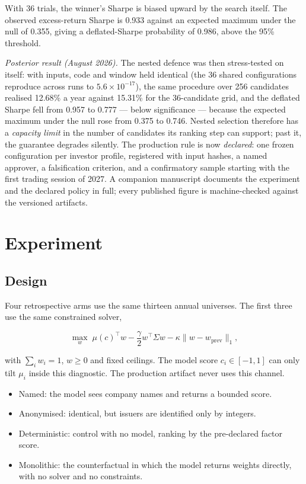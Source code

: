 \documentclass[10pt,conference]{IEEEtran}
\begin{document}
With 36 trials, the winner's Sharpe is biased upward by the search itself. The observed excess-return Sharpe is 0.933 against an expected maximum under the null of 0.355, giving a deflated-Sharpe probability of 0.986, above the 95\% threshold.

\emph{Posterior result (August 2026).} The nested defence was then stress-tested on itself: with inputs, code and window held identical (the 36 shared configurations reproduce across runs to $5.6\times10^{-17}$), the same procedure over 256 candidates realised 12.68\% a year against 15.31\% for the 36-candidate grid, and the deflated Sharpe fell from 0.957 to 0.777 --- below significance --- because the expected maximum under the null rose from 0.375 to 0.746. Nested selection therefore has a \emph{capacity limit} in the number of candidates its ranking step can support; past it, the guarantee degrades silently. The production rule is now \emph{declared}: one frozen configuration per investor profile, registered with input hashes, a named approver, a falsification criterion, and a confirmatory sample starting with the first trading session of 2027. A companion manuscript documents the experiment and the declared policy in full; every published figure is machine-checked against the versioned artifacts.

\section{Experiment}

\subsection{Design}

Four retrospective arms use the same thirteen annual universes. The first three use the same constrained solver,

\begin{equation}
\max_w\;\mu(c)^\top w-\frac{\gamma}{2}w^\top\Sigma w-\kappa\lVert w-w_{\mathrm{prev}}\rVert_1,
\end{equation}

with $\sum_iw_i=1$, $w\ge0$ and fixed ceilings. The model score $c_i\in[-1,1]$ can only tilt $\mu_i$ inside this diagnostic. The production artifact never uses this channel.

\begin{itemize}
\item Named: the model sees company names and returns a bounded score.
\item Anonymised: identical, but issuers are identified only by integers.
\item Deterministic: control with no model, ranking by the pre-declared factor score.
\item Monolithic: the counterfactual in which the model returns weights directly, with no solver and no constraints.
\end{itemize}
\end{document}
